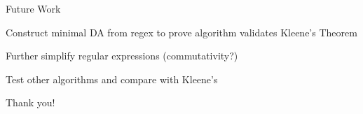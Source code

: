 \documentclass{beamer}
\begin{document}
\begin{frame}{Future Work}
	\centering\Large
	
	Construct minimal DA from regex to prove algorithm validates Kleene's Theorem \vspace{5mm}
	
	Further simplify regular expressions (commutativity?) \vspace{5mm}
	
	Test other algorithms and compare with Kleene's
      \end{frame}

      \begin{frame}
        \centering\Large

        Thank you!
      \end{frame}
      
\end{document}
